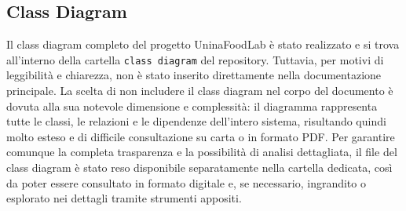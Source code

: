 \subsection{Class Diagram}

Il class diagram completo del progetto UninaFoodLab è stato realizzato e si trova all'interno della cartella \texttt{class diagram} del repository. Tuttavia, per motivi di leggibilità e chiarezza, non è stato inserito direttamente nella documentazione principale. 
La scelta di non includere il class diagram nel corpo del documento è dovuta alla sua notevole dimensione e complessità: il diagramma rappresenta tutte le classi, le relazioni e le dipendenze dell'intero sistema, risultando quindi molto esteso e di difficile consultazione su carta o in formato PDF. 
Per garantire comunque la completa trasparenza e la possibilità di analisi dettagliata, il file del class diagram è stato reso disponibile separatamente nella cartella dedicata, così da poter essere consultato in formato digitale e, se necessario, ingrandito o esplorato nei dettagli tramite strumenti appositi.
